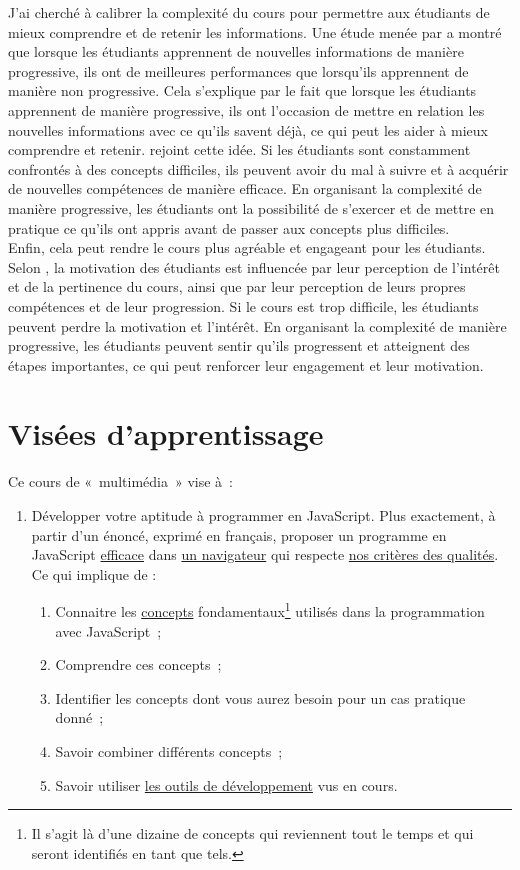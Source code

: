 J'ai cherché à calibrer la complexité du cours pour permettre aux étudiants de mieux comprendre et de retenir les informations. Une étude menée par \citet{mayer2003nine} a montré que lorsque les étudiants apprennent de nouvelles informations de manière progressive, ils ont de meilleures performances que lorsqu'ils apprennent de manière non progressive. Cela s'explique par le fait que lorsque les étudiants apprennent de manière progressive, ils ont l'occasion de mettre en relation les nouvelles informations avec ce qu'ils savent déjà, ce qui peut les aider à mieux comprendre et retenir. \citet{gagne1974principles} rejoint cette idée. Si les étudiants sont constamment confrontés à des concepts difficiles, ils peuvent avoir du mal à suivre et à acquérir de nouvelles compétences de manière efficace. En organisant la complexité de manière progressive, les étudiants ont la possibilité de s'exercer et de mettre en pratique ce qu'ils ont appris avant de passer aux concepts plus difficiles.\\

Enfin, cela peut rendre le cours plus agréable et engageant pour les étudiants. Selon \citet{keller1987development}, la motivation des étudiants est influencée par leur perception de l'intérêt et de la pertinence du cours, ainsi que par leur perception de leurs propres compétences et de leur progression. Si le cours est trop difficile, les étudiants peuvent perdre la motivation et l'intérêt. En organisant la complexité de manière progressive, les étudiants peuvent sentir qu'ils progressent et atteignent des étapes importantes, ce qui peut renforcer leur engagement et leur motivation.

\clearpage
\section{Visées d’apprentissage}

Ce cours de «~multimédia~» vise à~:
\begin{enumerate}
    \item Développer votre aptitude à programmer en JavaScript. Plus exactement, à partir d'un énoncé, exprimé en français, proposer un programme en JavaScript \underline{efficace} dans \underline{un navigateur} qui respecte \underline{nos critères des qualités}. Ce qui implique de :
          \begin{enumerate}
              \item Connaitre les \underline{concepts} fondamentaux\footnote{Il s'agit là d'une dizaine de concepts qui reviennent tout le temps et qui seront identifiés en tant que tels.} utilisés dans la programmation avec JavaScript~;
              \item Comprendre ces concepts~;
              \item Identifier les concepts dont vous aurez besoin pour un cas pratique donné~;
              \item Savoir combiner différents concepts~;
              \item Savoir utiliser \underline{les outils de développement} vus en cours.\\
          \end{enumerate}
\end{enumerate}


